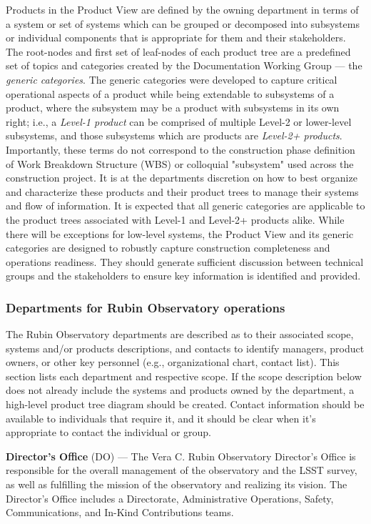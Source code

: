Products in the Product View are defined by the owning department in terms of a system or set of systems which can be grouped or decomposed into subsystems or individual components that is appropriate for them and their stakeholders.
The root-nodes and first set of leaf-nodes of each product tree are a predefined set of topics and categories created by the Documentation Working Group --- the \emph{generic categories}.
The generic categories were developed to capture critical operational aspects of a product while being extendable to subsystems of a product, where the subsystem may be a product with subsystems in its own right; i.e., a \emph{Level-1 product} can be comprised of multiple Level-2 or lower-level subsystems, and those subsystems which are products are \emph{Level-2+ products}.
Importantly, these terms do not correspond to the construction phase definition of Work Breakdown Structure (WBS) or colloquial "subsystem" used across the construction project.
It is at the departments discretion on how to best organize and characterize these products and their product trees to manage their systems and flow of information.
It is expected that all generic categories are applicable to the product trees associated with Level-1 and Level-2+ products alike.
While there will be exceptions for low-level systems, the Product View and its generic categories are designed to robustly capture construction completeness and operations readiness.
They should generate sufficient discussion between technical groups and the stakeholders to ensure key information is identified and provided.

\subsubsection{Departments for Rubin Observatory operations}

The Rubin Observatory departments are described as to their associated scope, systems and/or products descriptions, and contacts to identify managers, product owners, or other key personnel (e.g., organizational chart, contact list).
This section lists each department and respective scope.
If the scope description below does not already include the systems and products owned by the department, a high-level product tree diagram should be created.
Contact information should be available to individuals that require it, and it should be clear when it's appropriate to contact the individual or group.

\textbf{Director's Office} (DO) ---
The Vera C. Rubin Observatory Director's Office is responsible for the overall management of the observatory and the LSST survey, as well as fulfilling the mission of the observatory and realizing its vision.
The Director's Office includes a Directorate, Administrative Operations, Safety, Communications, and In-Kind Contributions teams.

